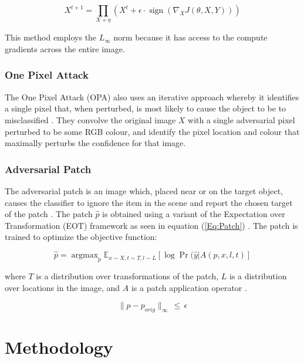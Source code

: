\documentclass{article}
\DeclareMathOperator{\sign}{sign}
\DeclareMathOperator*{\argmax}{argmax}
\begin{document}
\begin{equation}\label{Eq:PGD}
X^{t + 1} = \prod_{X + \eta} (X^t + \epsilon\cdot \sign(\nabla_X J(\theta, X, Y)))
\end{equation}

This method employs the $L_\infty$ norm because it has access to the compute gradients across the entire image. 

\subsubsection{One Pixel Attack}

The One Pixel Attack (OPA) also uses an iterative approach whereby it identifies a single pixel that, when perturbed, is most likely to cause the object to be to misclassified \cite{su_one_2019}. They convolve the original image $X$ with a single adversarial pixel perturbed to be some RGB colour, and identify the pixel location and colour that maximally perturbs the confidence for that image.     

\subsubsection{Adversarial Patch}

The adversarial patch is an image which, placed near or on the target object, causes the classifier to ignore the item in the scene and report the chosen target of the patch \cite{brown_adversarial_2018}. The patch $\hat{p}$ is obtained using a variant of the Expectation over Transformation (EOT) framework as seen in equation (\ref{Eq:Patch}) \cite{athalye_obfuscated_2018}. The patch is trained to optimize the objective function:

\begin{equation}\label{Eq:Patch}
\hat{p} = \argmax_{p} \mathbb{E}_{x\sim X,t\sim T,l\sim L} [\log \Pr(\hat{y}|A(p, x, l, t)]
\end{equation}

where $T$ is a distribution over transformations of the patch, $L$ is a distribution over locations in the image, and $A$ is a patch application operator \cite{brown_adversarial_2018}.

\begin{equation}
\label{Eq:constraint1} 
\parallel p - p_{orig} 
\parallel_{\infty} \,\le\, \epsilon 
\end{equation}  
  

\section{Methodology}
\end{document}
